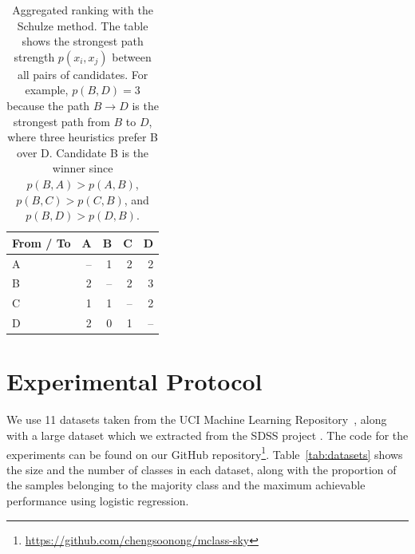 \documentclass[fleqn,10pt,lineno]{wlpeerj} %
\begin{document}
\begin{table}[htbp]
	\begin{subtable}{\linewidth}
		\centering
		\begin{tabular}{lrrrr}
			\toprule
			{From / To}  & A & B & C & D \\
			\midrule
				A & -- & 1 & 2 & 2 \\
				B & 2 & -- & 2 & 3 \\
				C & 1 & 1 & -- & 2 \\
				D & 2 & 0 & 1 & -- \\
			\bottomrule
		\end{tabular}
		\caption{Aggregated ranking with the Schulze method. The table shows
		the strongest path strength $p(x_i, x_j)$ between all pairs of
		candidates. For example, $p(B, D) = 3$ because the path $B \rightarrow
		D$ is the strongest path from $B$ to $D$, where three heuristics prefer
		B over D. Candidate B is the winner since $p(B, A) > p(A, B)$, $p(B, C)
		> p(C, B)$, and $p(B, D) > p(D, B)$.}
	\end{subtable}
\end{table}


\section{Experimental Protocol}\label{sec:expt}

We use 11 datasets taken from the UCI Machine Learning
Repository~\citep{lichman13}, along with a large dataset which we extracted
from the SDSS project \citep{alam15}. The code for the experiments can be found
on our GitHub
repository\footnote{\url{https://github.com/chengsoonong/mclass-sky}}.
Table~\ref{tab:datasets} shows the size and the number of classes in each
dataset, along with the proportion of the samples belonging to the majority
class and the maximum achievable performance using logistic regression.
\end{document}
